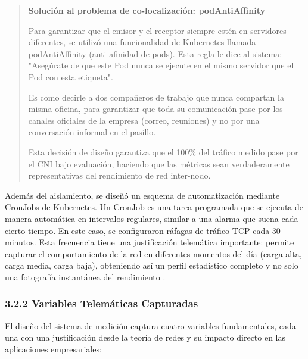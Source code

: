 \documentclass[journal]{IEEEtran}
\begin{document}
\begin{quote}
\textbf{Solución al problema de co-localización: podAntiAffinity}

Para garantizar que el emisor y el receptor siempre estén en servidores diferentes, se utilizó una funcionalidad de Kubernetes llamada podAntiAffinity (anti-afinidad de pods). Esta regla le dice al sistema: "Asegúrate de que este Pod nunca se ejecute en el mismo servidor que el Pod con esta etiqueta".

Es como decirle a dos compañeros de trabajo que nunca compartan la misma oficina, para garantizar que toda su comunicación pase por los canales oficiales de la empresa (correo, reuniones) y no por una conversación informal en el pasillo.

Esta decisión de diseño garantiza que el 100\% del tráfico medido pase por el CNI bajo evaluación, haciendo que las métricas sean verdaderamente representativas del rendimiento de red inter-nodo.
\end{quote}

Además del aislamiento, se diseñó un esquema de automatización mediante CronJobs de Kubernetes. Un CronJob es una tarea programada que se ejecuta de manera automática en intervalos regulares, similar a una alarma que suena cada cierto tiempo. En este caso, se configuraron ráfagas de tráfico TCP cada 30 minutos. Esta frecuencia tiene una justificación telemática importante: permite capturar el comportamiento de la red en diferentes momentos del día (carga alta, carga media, carga baja), obteniendo así un perfil estadístico completo y no solo una fotografía instantánea del rendimiento \cite{ref7}.

\subsubsection{3.2.2 Variables Telemáticas Capturadas}

El diseño del sistema de medición captura cuatro variables fundamentales, cada una con una justificación desde la teoría de redes y su impacto directo en las aplicaciones empresariales:
\end{document}
